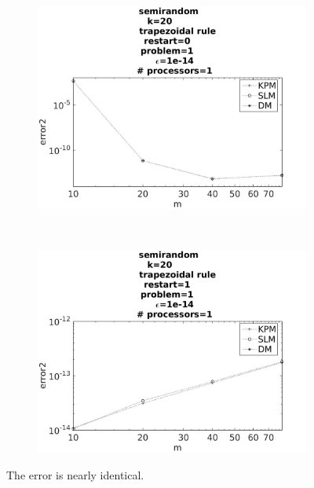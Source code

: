 \begin{figure}[H]
        \centering
        \begin{subfigure}[b]{0.45\textwidth}
                \includegraphics[width=\textwidth]{../MATLAB/fig/sresulterrorr.jpg}
                \caption{  }
                \label{fig:sresulterror1}
        \end{subfigure}
        ~
        \begin{subfigure}[b]{0.45\textwidth}
                \includegraphics[width=\textwidth]{../MATLAB/fig/sresulterror.jpg}
                \caption{  }
                \label{fig:sresulterror2}
        \end{subfigure}
        \caption{ The error is nearly identical.  }
        \label{fig:sresulterror}
\end{figure}


